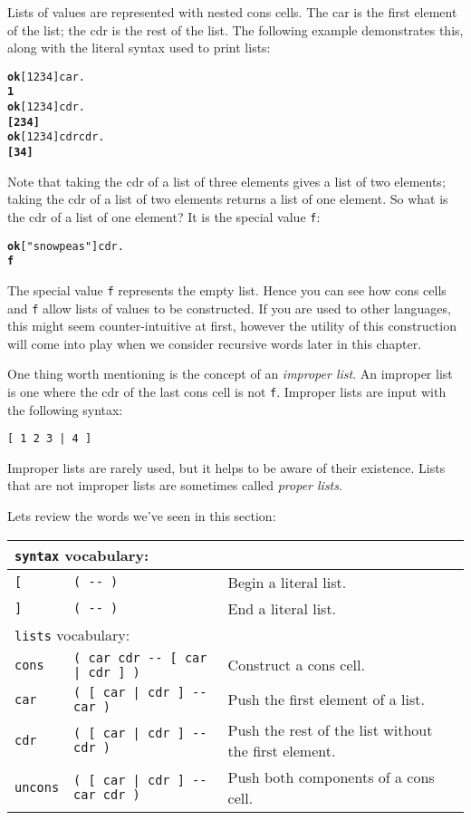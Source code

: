\documentclass[english]{book}
\newcommand{\wordtable}[1]{{
\begin{tabularx}{12cm}{|l l X|}
#1
\hline
\end{tabularx}}}
\newcommand{\tabvocab}[1]{
\hline
\multicolumn{3}{|l|}{
\rule[-2mm]{0mm}{6mm}
\texttt{#1} vocabulary:}
\\
\hline
}
\begin{document}
Lists of values are represented with nested cons cells. The car is the first element of the list; the cdr is the rest of the list. The following example demonstrates this, along with the literal syntax used to print lists:

\begin{alltt}
\textbf{ok} {[} 1 2 3 4 {]} car .
\textbf{1}
\textbf{ok} {[} 1 2 3 4 {]} cdr .
\textbf{{[} 2 3 4 {]}}
\textbf{ok} {[} 1 2 3 4 {]} cdr cdr .
\textbf{{[} 3 4 {]}}
\end{alltt}

Note that taking the cdr of a list of three elements gives a list of two elements; taking the cdr of a list of two elements returns a list of one element. So what is the cdr of a list of one element? It is the special value \texttt{f}:

\begin{alltt}
\textbf{ok} {[} "snowpeas" {]} cdr .
\textbf{f}
\end{alltt}

The special value \texttt{f} represents the empty list. Hence you can see how cons cells and \texttt{f} allow lists of values to be constructed. If you are used to other languages, this might seem counter-intuitive at first, however the utility of this construction will come into play when we consider recursive words later in this chapter.

One thing worth mentioning is the concept of an \emph{improper list}. An improper list is one where the cdr of the last cons cell is not \texttt{f}. Improper lists are input with the following syntax:

\begin{verbatim}
[ 1 2 3 | 4 ]
\end{verbatim}

Improper lists are rarely used, but it helps to be aware of their existence. Lists that are not improper lists are sometimes called \emph{proper lists}.

Lets review the words we've seen in this section:

\wordtable{
\tabvocab{syntax}
\texttt{{[}}&
\texttt{( -{}- )}&
Begin a literal list.\\
\texttt{{]}}&
\texttt{( -{}- )}&
End a literal list.\\
\tabvocab{lists}
\texttt{cons}&
\texttt{( car cdr -{}- {[} car | cdr {]} )}&
Construct a cons cell.\\
\texttt{car}&
\texttt{( {[} car | cdr {]} -{}- car )}&
Push the first element of a list.\\
\texttt{cdr}&
\texttt{( {[} car | cdr {]} -{}- cdr )}&
Push the rest of the list without the first element.\\
\texttt{uncons}&
\texttt{( {[} car | cdr {]} -{}- car cdr )}&
Push both components of a cons cell.\\}
\end{document}
